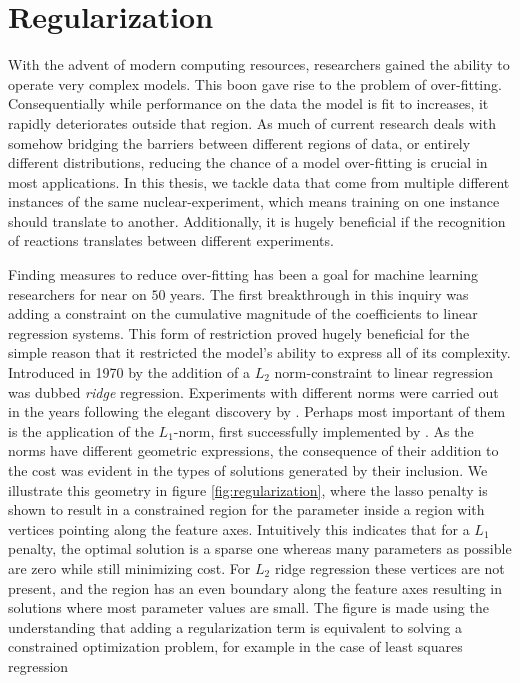 \section{Regularization}\label{sec:regularization}

With the advent of modern computing resources, researchers gained the ability to operate very complex models. This boon gave rise to the problem of over-fitting. Consequentially while performance on the data the model is fit to increases, it rapidly deteriorates outside that region. As much of current research deals with somehow bridging the barriers between different regions of data, or entirely different distributions, reducing the chance of a model over-fitting is crucial in most applications. In this thesis, we tackle data that come from multiple different instances of the same nuclear-experiment, which means training on one instance should translate to another. Additionally, it is hugely beneficial if the recognition of reactions translates between different experiments.   

Finding measures to reduce over-fitting has been a goal for machine learning researchers for near on $50$ years. The first breakthrough in this inquiry was adding a constraint on the cumulative magnitude of the coefficients to linear regression systems. This form of restriction proved hugely beneficial for the simple reason that it restricted the model's ability to express all of its complexity. Introduced in 1970 by \citet{Hoerl1970} the addition of a $L_2$ norm-constraint to linear regression was dubbed \textit{ridge} regression. Experiments with different norms were carried out in the years following the elegant discovery by \citet{Hoerl1970}. Perhaps most important of them is the application of the $L_1$-norm, first successfully implemented by \citet{Tibshirani1996}. As the norms have different geometric expressions, the consequence of their addition to the cost was evident in the types of solutions generated by their inclusion. We illustrate this geometry in figure \ref{fig:regularization}, where the lasso penalty is shown to result in a constrained region for the parameter inside a region with vertices pointing along the feature axes. Intuitively this indicates that for a $L_1$ penalty, the optimal solution is a sparse one whereas many parameters as possible are zero while still minimizing cost. For $L_2$ ridge regression these vertices are not present, and the region has an even boundary along the feature axes resulting in solutions where most parameter values are small. The figure is made using the understanding that adding a regularization term is equivalent to solving a constrained optimization problem, for example in the case of least squares regression 

